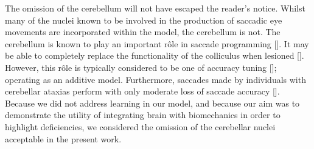\documentclass{frontiersSCNS}
\begin{document}
The omission of the cerebellum will not have escaped the reader's notice.
Whilst many of the nuclei known to be involved in the production of
saccadic eye movements are incorporated within the model, the cerebellum
is not. The cerebellum is known to play an important r\^ole in saccade
programming
[\cite{dean_learning_1994, schweighofer_model_1996,quaia_extent_2000,kleine_saccade-related_2003}].
It may be able to completely replace the functionality of the colliculus
when lesioned [\cite{aizawa_reversible_1998,lefevre_distributed_1998}].
However, this r\^ole is typically considered to be one of accuracy tuning
[\cite{barash_saccadic_1999,dean_learning_1994}]; operating as an additive
model. Furthermore, saccades made by individuals with cerebellar ataxias
perform with only moderate loss of saccade accuracy
[\cite{barash_saccadic_1999,federighi_differences_2011}]. Because we
did not address learning in our model, and because our aim was to
demonstrate the utility of integrating brain with biomechanics in order
to highlight deficiencies, we considered the omission of the cerebellar
nuclei acceptable in the present work.








\end{document}
